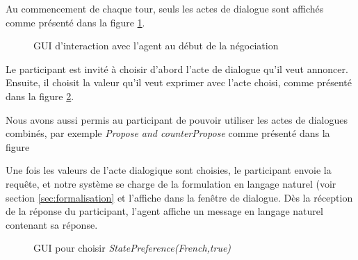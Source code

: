 {					Au commencement de chaque tour, seuls les actes de dialogue sont affichés comme présenté dans la figure \ref{fig:commencement}. 
					\begin{figure}[t]
						\centering
						\caption{GUI d'interaction avec l'agent au début de la négociation}
						\label{fig:commencement}
					\end{figure} 
					Le participant est invité à choisir d'abord l'acte de dialogue qu'il veut annoncer. Ensuite, il choisit la valeur qu'il veut exprimer avec l'acte choisi, comme présenté dans la figure \ref{fig:statIhm}.
					
					Nous avons aussi permis au participant de pouvoir utiliser les actes de dialogues combinés, par exemple \emph{Propose and counterPropose} comme présenté dans la figure 
					
					Une fois les valeurs de l'acte dialogique sont choisies, le participant envoie la requête, et notre système se charge de la formulation en langage naturel (voir section \ref{sec:formalisation} et l'affiche dans la fenêtre de dialogue. Dès la réception de la réponse du participant, l'agent affiche un message en langage naturel contenant sa réponse. 
					
					
					
					\begin{figure}[b]
						\centering
						\caption{GUI pour choisir \emph{StatePreference(French,true)} }
						\label{fig:statIhm}
					\end{figure}
					
}
